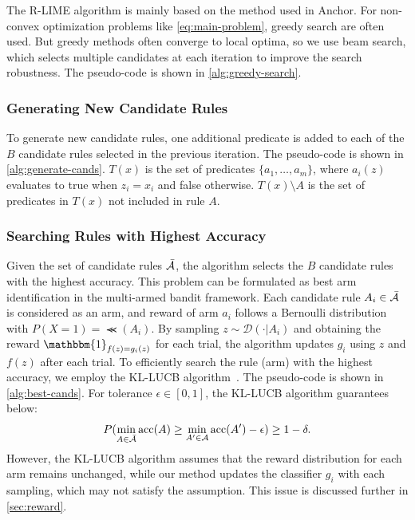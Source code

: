 \documentclass[runningheads]{llncs}
\begin{document}
{{  \begin{algorithm}[p]
    \small
    
  \end{algorithm}
}
The R-LIME algorithm
is mainly based on the method used in Anchor\cite{ribeiro2018anchors}.
For non-convex optimization problems like \cref{eq:main-problem},
greedy search are often used.
But greedy methods often converge to local optima,
so we use beam search, which selects multiple candidates at each iteration
to improve the search robustness.
The pseudo-code is shown in \cref{alg:greedy-search}.

\subsubsection{Generating New Candidate Rules}
To generate new candidate rules,
one additional predicate is added to each of the $B$ candidate rules
selected in the previous iteration.
The pseudo-code is shown in \cref{alg:generate-cands}.
$T(x)$ is the set of predicates $\{a_1,\dots,a_m\}$,
where $a_i(z)$ evaluates to true when $z_i=x_i$ and false otherwise.
$T(x)\setminus A$ is the set of predicates in $T(x)$ not included in rule $A$.

\subsubsection{Searching Rules with Highest Accuracy}
Given the set of candidate rules $\bar{\mathcal{A}}$,
the algorithm selects the $B$ candidate rules with the highest accuracy.
This problem can be formulated
as best arm identification in the multi-armed bandit framework.
Each candidate rule $A_i\in\bar{\mathcal{A}}$ is considered as an arm,
and reward of arm $a_i$ follows a Bernoulli distribution
with $P(X=1)=\Prec(A_i)$.
By sampling $z\sim\mathcal{D}(\cdot|A_i)$
and obtaining the reward $\mathbbm{1}_{f(z)=g_i(z)}$ for each trial,
the algorithm updates $g_i$ using $z$ and $f(z)$ after each trial.
To efficiently search the rule (arm) with the highest accuracy,
we employ the KL-LUCB algorithm~\cite{kaufmann2013information}.
The pseudo-code is shown in \cref{alg:best-cands}.
For tolerance $\epsilon\in[0,1]$, the KL-LUCB algorithm guarantees below:
\begin{equation}
  P(\underset{A\in\bar{\mathcal{A}}}{\min}\operatorname{acc}(A)\ge
  \underset{A'\in\mathcal{A}}{\min}\operatorname{acc}(A')-\epsilon)\ge1-\delta.
\end{equation}
However,
the KL-LUCB algorithm assumes that the reward distribution for each arm
remains unchanged,
while our method updates the classifier $g_i$ with each sampling,
which may not satisfy the assumption.
This issue is discussed further in \cref{sec:reward}.

}
\end{document}
